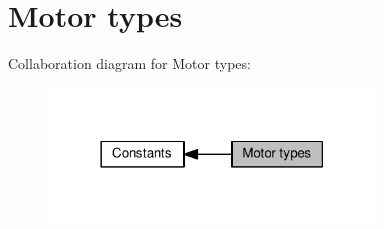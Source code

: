 \hypertarget{group__IL__CONST__MOTOR}{}\section{Motor types}
\label{group__IL__CONST__MOTOR}
Collaboration diagram for Motor types\+:\nopagebreak
\begin{figure}[H]
\begin{center}
\leavevmode
\includegraphics[width=246pt]{group__IL__CONST__MOTOR}
\end{center}
\end{figure}
